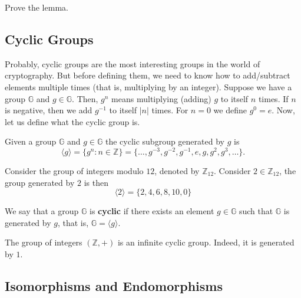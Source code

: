 \documentclass[../lecture-notes.tex]{subfiles}
\begin{document}
\begin{exercise}
    Prove the lemma.
\end{exercise}

\subsection{Cyclic Groups}

Probably, cyclic groups are the most interesting groups in the world of cryptography. But before defining them, we need to know how to add/subtract elements multiple times (that is, multiplying by an integer). Suppose 
we have a group $\mathbb{G}$ and $g \in \mathbb{G}$. Then, $g^n$ means multiplying (adding) $g$ to itself $n$ times. If $n$ is negative, then we add $g^{-1}$ to itself $|n|$ times. For $n=0$ we define $g^0 = e$. Now, let us define what the cyclic group is.
\begin{definition}
    Given a group $\mathbb{G}$ and $g \in \mathbb{G}$ the cyclic subgroup generated by $g$ is
    \begin{equation}
        \langle g \rangle = \{g^n: n \in \mathbb{Z}\} = \{\dots,g^{-3}, g^{-2}, g^{-1}, e, g, g^2, g^3, \dots\}.
    \end{equation}
\end{definition}

\begin{example}
    Consider the group of integers modulo $12$, denoted by $\mathbb{Z}_{12}$. Consider $2 \in \mathbb{Z}_{12}$, the group generated by $2$ is then
    \begin{equation}
        \langle 2 \rangle = \{2,4,6,8,10, 0\}
    \end{equation}
\end{example}

\begin{definition}
    We say that a group $\mathbb{G}$ is \textbf{cyclic} if there exists an element $g \in \mathbb{G}$ such that $\mathbb{G}$ is generated by $g$, that is, $\mathbb{G} = \langle g \rangle$.
\end{definition}

\begin{example}
    The group of integers $(\mathbb{Z},+)$ is an infinite cyclic group. Indeed, it is generated by $1$.
\end{example}

\subsection{Isomorphisms and Endomorphisms}
\end{document}
